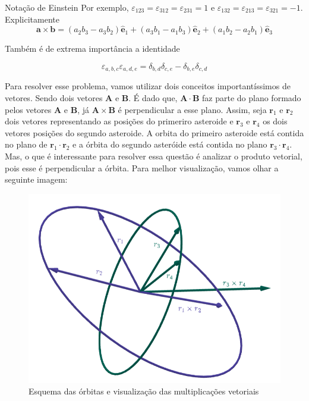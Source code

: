 \documentclass[11pt]{article}
\begin{document}
\begin{pproblem}
\begin{psidea}{Notação de Einstein}{}
        Por exemplo, \(\varepsilon_{123} = \varepsilon_{312} = \varepsilon_{231} = 1\) e \(\varepsilon_{132} = \varepsilon_{213} = \varepsilon_{321} = -1\).
        Explicitamente 
        \[\mathbf{a} \times \mathbf{b} = (a_2 b_3 - a_3 b_2) \hat{\mathbf{e}}_1 + (a_3 b_1 - a_1 b_3) \hat{\mathbf{e}}_2 + (a_1 b_2 - a_2 b_1) \hat{\mathbf{e}}_3\]
   
        Também é de extrema importância a identidade 

        \[\varepsilon_{a,b,c}\varepsilon_{a,d,e} = \delta_{b,d}\delta_{c,e}-\delta_{b,e}\delta_{c,d}\]
    \end{psidea}
\begin{pssolution*}{}{}
    Para resolver esse problema, vamos utilizar dois conceitos importantíssimos de vetores. Sendo dois vetores $\mathbf A$ e $\mathbf B$. É dado que, $\mathbf A \cdot \mathbf B$ faz parte do plano formado pelos vetores $\mathbf A$ e $\mathbf B$, já $\mathbf A \times \mathbf B$ é perpendicular a esse plano. Assim, seja $\mathbf r_1$ e $\mathbf r_2$ dois vetores representando as posições do primeriro asteroide e $\mathbf r_3$ e $\mathbf r_4$ os dois vetores posições do segundo asteroide. A orbita do primeiro asteroide está contida no plano de $\mathbf r_1 \cdot \mathbf r_2$ e a órbita do segundo asteróide está contida no plano $\mathbf r_3 \cdot \mathbf r_4$. Mas, o que é interessante para resolver essa questão é analizar o produto vetorial, pois esse é perpendicular a órbita. Para melhor visualização, vamos olhar a seguinte imagem:

    \begin{figure}[H]
        \centering
        \includegraphics[width=0.8\linewidth]{imagens/orbitas3.png}
        \caption{Esquema das órbitas e visualização das multiplicações vetoriais}
    \end{figure}


\end{pssolution*}
\end{pproblem}
\end{document}
